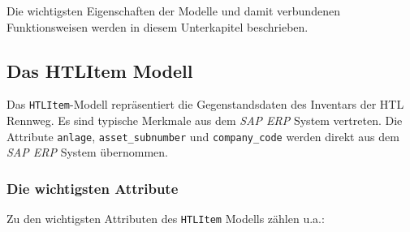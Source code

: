 Die wichtigsten Eigenschaften der Modelle und damit verbundenen
Funktionsweisen werden in diesem Unterkapitel beschrieben.

\hypertarget{das-htlitem-modell}{%
\subsection{Das HTLItem Modell}\label{das-htlitem-modell}}

Das \texttt{HTLItem}-Modell repräsentiert die Gegenstandsdaten des
Inventars der HTL Rennweg. Es sind typische Merkmale aus dem
\emph{SAP ERP}
System vertreten. Die Attribute \texttt{anlage},
\texttt{asset\_subnumber} und \texttt{company\_code} werden direkt aus
dem \emph{SAP ERP}
System übernommen.

\hypertarget{die-wichtigsten-attribute}{%
\subsubsection{Die wichtigsten
Attribute}\label{die-wichtigsten-attribute}}

Zu den wichtigsten Attributen des \texttt{HTLItem} Modells zählen u.a.:

